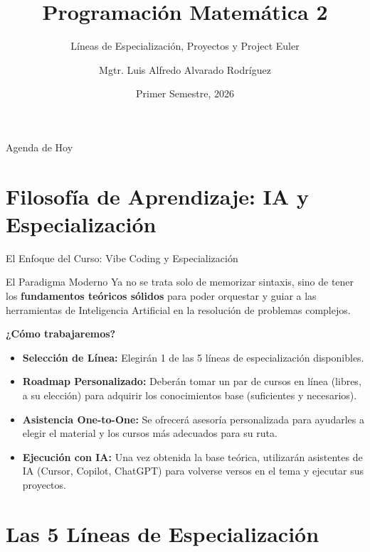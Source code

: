 \documentclass[aspectratio=169]{beamer}
\title[M503]{Programación Matemática 2}
\subtitle{Líneas de Especialización, Proyectos y Project Euler}
\author[Luis Alfredo Alvarado]{Mgtr. Luis Alfredo Alvarado Rodríguez}
\institute[ECFM - USAC]{
    Escuela de Ciencias Físicas y Matemáticas \\
    Universidad de San Carlos de Guatemala
}
\date{Primer Semestre, 2026}
\begin{document}
\begin{frame}
    \titlepage
\end{frame}

\begin{frame}{Agenda de Hoy}
    \tableofcontents
\end{frame}

\section{Filosofía de Aprendizaje: IA y Especialización}

\begin{frame}{El Enfoque del Curso: Vibe Coding y Especialización}
    \begin{block}{El Paradigma Moderno}
        Ya no se trata solo de memorizar sintaxis, sino de tener los \textbf{fundamentos teóricos sólidos} para poder orquestar y guiar a las herramientas de Inteligencia Artificial en la resolución de problemas complejos.
    \end{block}
    
    \vspace{0.3cm}
    \textbf{¿Cómo trabajaremos?}
    \begin{itemize}
        \item \textbf{Selección de Línea:} Elegirán 1 de las 5 líneas de especialización disponibles.
        \item \textbf{Roadmap Personalizado:} Deberán tomar un par de cursos en línea (libres, a su elección) para adquirir los conocimientos base (suficientes y necesarios).
        \item \textbf{Asistencia One-to-One:} Se ofrecerá asesoría personalizada para ayudarles a elegir el material y los cursos más adecuados para su ruta.
        \item \textbf{Ejecución con IA:} Una vez obtenida la base teórica, utilizarán asistentes de IA (Cursor, Copilot, ChatGPT) para volverse versos en el tema y ejecutar sus proyectos.
    \end{itemize}
\end{frame}

\section{Las 5 Líneas de Especialización}
\end{document}
